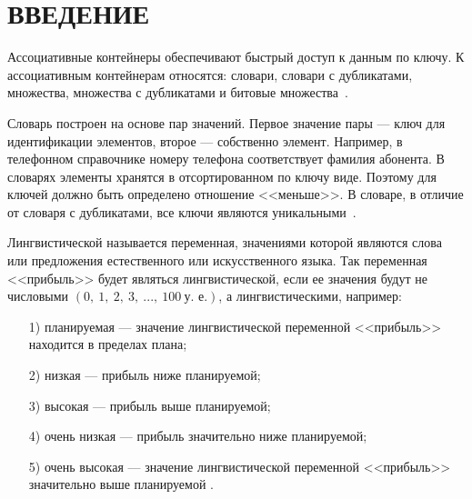 {\centering \chapter*{ВВЕДЕНИЕ}}

Ассоциативные контейнеры обеспечивают быстрый доступ к данным по ключу. 
К ассоциативным контейнерам относятся: словари, словари с дубликатами, множества, множества с дубликатами и битовые \mbox{множества \cite{Shuikova2016}}. 

Словарь построен на основе пар значений. 
Первое значение пары --- ключ для идентификации элементов, второе --- собственно элемент. 
Например, в телефонном справочнике номеру телефона соответствует фамилия абонента. 
В словарях элементы хранятся в отсортированном по ключу виде. 
Поэтому для ключей должно быть определено отношение <<меньше>>. 
В словаре, в отличие от словаря с дубликатами, все ключи являются \mbox{уникальными \cite{Shuikova2016}}.

Лингвистической называется переменная, значениями которой являются слова или предложения естественного или искусственного языка. 
Так переменная <<прибыль>> будет являться лингвистической, если ее значения будут не числовыми $(0,~1,~2,~3,~...,~100~\text{у.~е.})$, а лингвистическими, например:
\begin{enumerate}
\item[1)] планируемая --- значение лингвистической переменной <<прибыль>> находится в пределах плана;
\item[2)] низкая --- прибыль ниже планируемой;
\item[3)] высокая --- прибыль выше планируемой;
\item[4)] очень низкая --- прибыль значительно ниже планируемой;
\item[5)] очень высокая --- значение лингвистической переменной <<прибыль>> значительно выше планируемой \cite{Vasin2000}.
\end{enumerate}
